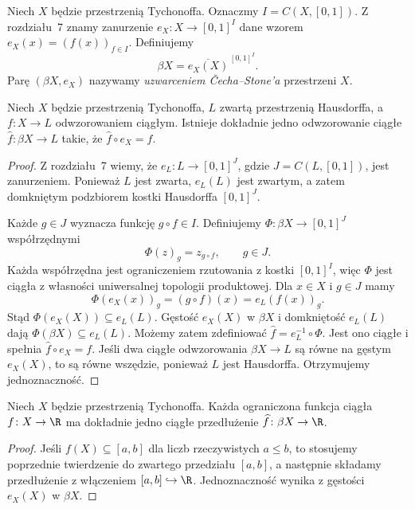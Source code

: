 \begin{definicja}
\label{def:topog-uzwarcenia-cech-stone}
Niech $X$ będzie przestrzenią Tychonoffa.
Oznaczmy $I=C(X,[0,1])$.
Z rozdziału~7 znamy zanurzenie
$e_X\colon X\to[0,1]^I$ dane wzorem
$e_X(x)=(f(x))_{f\in I}$.
Definiujemy
\[
\beta X=\overline{e_X(X)}^{\, [0,1]^I}.
\]
Parę $(\beta X,e_X)$ nazywamy
\emph{uzwarceniem Čecha--Stone'a}
przestrzeni $X$.
\end{definicja}

\begin{twierdzenie}
\label{thm:topog-uzwarcenia-cech-stone-uniwersalne}
Niech $X$ będzie przestrzenią Tychonoffa,
$L$ zwartą przestrzenią Hausdorffa,
a $f\colon X\to L$ odwzorowaniem ciągłym.
Istnieje dokładnie jedno
odwzorowanie ciągłe
$\widehat f\colon\beta X\to L$
takie, że $\widehat f\circ e_X=f$.
\end{twierdzenie}
\begin{proof}
Z rozdziału~7 wiemy, że
$e_L\colon L\to[0,1]^J$,
gdzie $J=C(L,[0,1])$,
jest zanurzeniem.
Ponieważ $L$ jest zwarta,
$e_L(L)$ jest zwartym, a zatem
domkniętym podzbiorem kostki
Hausdorffa $[0,1]^J$.

Każde $g\in J$ wyznacza
funkcję $g\circ f\in I$.
Definiujemy
$\Phi\colon\beta X\to[0,1]^J$
współrzędnymi
\[
\Phi(z)_g=z_{g\circ f},\qquad g\in J.
\]
Każda współrzędna jest ograniczeniem
rzutowania z kostki $[0,1]^I$,
więc $\Phi$ jest ciągła z własności
uniwersalnej topologii produktowej.
Dla $x\in X$ i $g\in J$ mamy
\[
\Phi(e_X(x))_g=(g\circ f)(x)
=e_L(f(x))_g.
\]
Stąd $\Phi(e_X(X))\subseteq e_L(L)$.
Gęstość $e_X(X)$ w $\beta X$
i domkniętość $e_L(L)$ dają
$\Phi(\beta X)\subseteq e_L(L)$.
Możemy zatem zdefiniować
$\widehat f=e_L^{-1}\circ\Phi$.
Jest ono ciągłe i spełnia
$\widehat f\circ e_X=f$.
Jeśli dwa ciągłe odwzorowania
$\beta X\to L$ są równe
na gęstym $e_X(X)$,
to są równe wszędzie,
ponieważ $L$ jest Hausdorffa.
Otrzymujemy jednoznaczność.
\end{proof}

\begin{wniosek}
\label{cor:topog-uzwarcenia-cech-stone-funkcje}
Niech $X$ będzie przestrzenią Tychonoffa.
Każda ograniczona funkcja ciągła
$f\colon X\to\R$ ma dokładnie jedno
ciągłe przedłużenie
$\widehat f\colon\beta X\to\R$.
\end{wniosek}
\begin{proof}
Jeśli $f(X)\subseteq[a,b]$
dla liczb rzeczywistych $a\le b$,
to stosujemy poprzednie twierdzenie
do zwartego przedziału $[a,b]$,
a następnie składamy przedłużenie
z włączeniem $[a,b]\hookrightarrow\R$.
Jednoznaczność wynika z gęstości
$e_X(X)$ w $\beta X$.
\end{proof}

